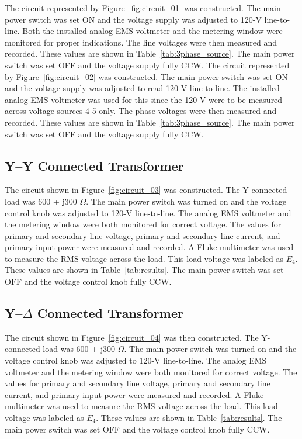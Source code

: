 \documentclass{article}
\begin{document}
\label{part1} The circuit represented by Figure~\ref{fig:circuit_01} was
constructed.  The main power switch was set ON and the voltage supply was
adjusted to 120-V line-to- line. Both the installed analog EMS voltmeter and
the metering window were monitored for proper indications. The line voltages
were then measured and recorded. These values are shown in
Table~\ref{tab:3phase_source}. The main power switch was set OFF and the
voltage supply fully {CCW}. The circuit represented by
Figure~\ref{fig:circuit_02} was constructed. The main power switch was set ON
and the voltage supply was adjusted to read 120-V line-to-line. The installed
analog EMS voltmeter was used for this since the 120-V were to be measured
across voltage sources 4-5 only. The phase voltages were then measured and
recorded. These values are shown in Table~\ref{tab:3phase_source}.  The main
power switch was set OFF and the voltage supply fully CCW.

\subsection{Y--Y Connected Transformer}

\label{part2} The circuit shown in Figure~\ref{fig:circuit_03} was constructed.
The Y-connected load was 600 + j300 $\Omega$. The main power switch was turned
on and the voltage control knob was adjusted to 120-V line-to-line. The analog
EMS voltmeter and the metering window were both monitored for correct voltage.
The values for primary and secondary line voltage, primary and secondary line
current, and primary input power were measured and recorded. A Fluke multimeter
was used to measure the RMS voltage across the load. This load voltage was
labeled as $E_4$. These values are shown in Table~\ref{tab:results}.  The main
power switch was set OFF and the voltage control knob fully CCW.

\subsection{Y--$\Delta$ Connected Transformer}

\label{part3} The circuit shown in Figure~\ref{fig:circuit_04} was then
constructed.  The Y-connected load was 600 + j300 $\Omega$. The main power
switch was turned on and the voltage control knob was adjusted to 120-V
line-to-line. The analog EMS voltmeter and the metering window were both
monitored for correct voltage. The values for primary and secondary line
voltage, primary and secondary line current, and primary input power were
measured and recorded. A Fluke multimeter was used to measure the RMS voltage
across the load. This load voltage was labeled as $E_4$. These values are shown
in Table~\ref{tab:results}.  The main power switch was set OFF and the voltage
control knob fully CCW.
\end{document}
